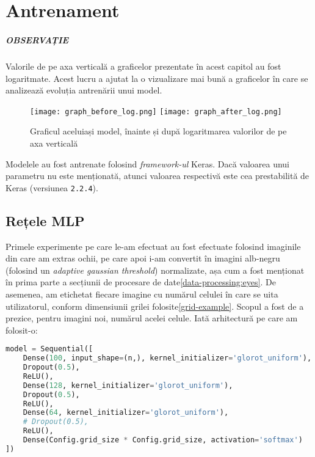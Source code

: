\chapter{Antrenament}
\label{chapter4}
\paragraph{OBSERVAȚIE}
Valorile de pe axa verticală a graficelor prezentate în acest capitol au fost logaritmate.
Acest lucru a ajutat la o vizualizare mai bună a graficelor în care se analizează evoluția antrenării unui model.

\begin{figure}[H]
    \centering
    \texttt{[image: graph\_before\_log.png]}
    \texttt{[image: graph\_after\_log.png]}
    \caption{Graficul aceluiași model, înainte și după logaritmarea valorilor de pe axa verticală}
\end{figure}

Modelele au fost antrenate folosind \emph{framework-ul} Keras.
Dacă valoarea unui parametru nu este menționată, atunci valoarea respectivă este cea prestabilită de Keras (versiunea \lstinline{2.2.4}).

\section{Rețele MLP}
Primele experimente pe care le-am efectuat au fost efectuate folosind imaginile din care am extras ochii, pe care apoi i-am convertit în imagini alb-negru (folosind un \emph{adaptive gaussian threshold}) normalizate, așa cum a fost menționat în prima parte a secțiunii de procesare de date\ref{data-processing:eyes}.
De asemenea, am etichetat fiecare imagine cu numărul celulei în care se uita utilizatorul, conform dimensiunii grilei folosite\ref{grid-example}.
Scopul a fost de a prezice, pentru imagini noi, numărul acelei celule.
Iată arhitectură pe care am folosit-o:

\begin{lstlisting}[language=Python, caption=Arhitectura MLP]
model = Sequential([
    Dense(100, input_shape=(n,), kernel_initializer='glorot_uniform'),
    Dropout(0.5),
    ReLU(),
    Dense(128, kernel_initializer='glorot_uniform'),
    Dropout(0.5),
    ReLU(),
    Dense(64, kernel_initializer='glorot_uniform'),
    # Dropout(0.5),
    ReLU(),
    Dense(Config.grid_size * Config.grid_size, activation='softmax')
])
\end{lstlisting}

